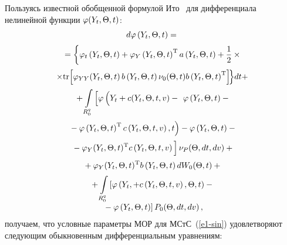\begin{multicols}{2}
Пользуясь известной обобщенной формулой Ито~\cite{1-sin, 2-sin, 13-sin}
для дифференциала нелинейной функции $\varphi (Y_t , \Theta, t)$:
   \begin{multline*}
    d\vrp \left(Y_t, \Theta, t\right) ={}\\[2pt]
{}=
    \left\{ \vphantom{\fr{1}{2}}\vrp_t \left(Y_t, \Theta, t\right)+
    \vrp_Y \left(Y_t, \Theta, t\right)^{\mathrm{T}}
    a \left(Y_t, \Theta, t\right)+\fr{1}{2}\times{}\right.\\[2pt]
\left.\hspace*{-3.5pt}\times   \mathrm{tr} \!\left[
\vrp_{YY} \!\left(
Y_t, \Theta, t\right) b\left(Y_t, \Theta, t\right)\nu_0(\Theta, t)
b\left(Y_t, \Theta, t\right)^{\mathrm{T}}
\right]\!\right\}\!  dt+\hspace*{-1.33pt}\\[2pt]
{}+
\iii_{R_0^q} \left[ \vrp  \left(
\vphantom{\left(Y_t\right)^{\mathrm{T}}}
Y_t + c (Y_t, \Theta, t,v) -{}\right.\right.
\vrp \left(Y_t, \Theta, t\right)-{}\\[2pt]
\left.{}- \vrp \left(Y_t, \Theta, t\right)^{\mathrm{T}}
c \left(Y_t, \Theta, t,v\right),t \right) - \vrp \left(Y_t, \Theta, t\right)-{}\\[2pt]
\left.{}- \vrp_Y (Y_t, \Theta, t)^{\mathrm{T}}
c\left(Y_t, \Theta, t,v\right)
\vphantom{\left(Y_t\right)^{\mathrm{T}}}
\right] \nu_P (\Theta, dt, dv)+{}\\[2pt]
{}+
\vrp_Y(Y_t, \Theta, t)^{\mathrm{T}} b \left(Y_t, \Theta, t\right) dW_0 (\Theta, t) +{}\\[2pt]
{}+\iii_{R_0^q} \left[ \vrp\left(Y_t,+c\left(Y_t, \Theta, t,v\right), \Theta, t
\right) -{}\right.\\[-4pt]
\left.{}-
\vrp \left(Y_t, \Theta, t\right)\right] P_0 (\Theta, dt,dv)\,,
\end{multline*}
получаем, что условные
параметры МОР для МСтС~(\ref{e1-sin}) удовлетворяют следующим
обыкновенным дифференциальным уравнениям:


\end{multicols}
